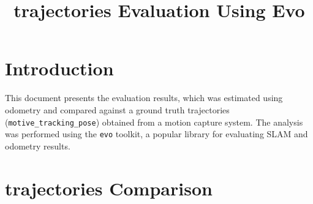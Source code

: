 \documentclass[11pt]{article}
\title{trajectories Evaluation Using Evo}
\author{}
\date{}
\begin{document}
\maketitle

\section{Introduction}

This document presents the evaluation results, which was estimated using odometry and compared against a ground truth trajectories (\texttt{motive\_tracking\_pose}) obtained from a motion capture system. The analysis was performed using the \texttt{evo} toolkit, a popular library for evaluating SLAM and odometry results.

\section{trajectories Comparison}
\end{document}
